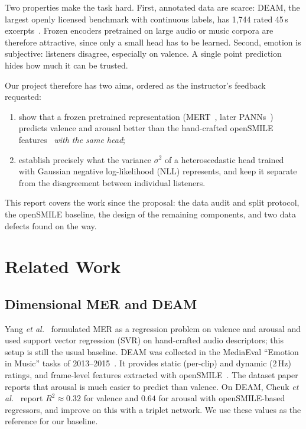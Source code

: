 \documentclass[conference]{IEEEtran}
\newcommand{\R}{R^2}
\begin{document}
Two properties make the task hard. First, annotated data are scarce: DEAM, the
largest openly licensed benchmark with continuous labels, has 1{,}744 rated
45\,s excerpts~\cite{aljanaki2017}. Frozen encoders pretrained on large audio
or music corpora are therefore attractive, since only a small head has to be
learned. Second, emotion is subjective: listeners disagree, especially on
valence. A single point prediction hides how much it can be trusted.

Our project therefore has two aims, ordered as the instructor's feedback
requested:
\begin{enumerate}
\item show that a frozen pretrained representation (MERT~\cite{li2024mert},
later PANNs~\cite{kong2020}) predicts valence and arousal better than the
hand-crafted openSMILE features~\cite{eyben2010} \emph{with the same head};
\item establish precisely what the variance $\sigma^2$ of a heteroscedastic
head trained with Gaussian negative log-likelihood (NLL) represents, and keep
it separate from the disagreement between individual listeners.
\end{enumerate}
This report covers the work since the proposal: the data audit and split
protocol, the openSMILE baseline, the design of the remaining components, and
two data defects found on the way.

\section{Related Work}
\label{sec:related}
\subsection{Dimensional MER and DEAM}
Yang \emph{et al.}~\cite{yang2008} formulated MER as a regression problem on
valence and arousal and used support vector regression (SVR) on hand-crafted
audio descriptors; this setup is still the usual baseline. DEAM was collected
in the MediaEval ``Emotion in Music'' tasks of 2013--2015~\cite{aljanaki2017}.
It provides static (per-clip) and dynamic (2\,Hz) ratings, and frame-level
features extracted with openSMILE~\cite{eyben2010}. The dataset paper reports
that arousal is much easier to predict than valence. On DEAM, Cheuk \emph{et
al.}~\cite{cheuk2020} report $\R\approx0.32$ for valence and $0.64$ for arousal
with openSMILE-based regressors, and improve on this with a triplet network.
We use these values as the reference for our baseline.
\end{document}
